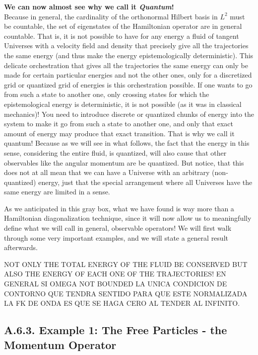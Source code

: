 \documentclass[11pt, a4paper]{article} %
\DeclareRobustCommand{\mybox}[2][gray!10]{%
\begin{tcolorbox}[   %
        left=0.2cm,
        right=0.2cm,
        top=0.15cm,
        bottom=0.15cm,
        colback=#1,
        colframe=#1,
        width=\dimexpr\textwidth\relax, 
        enlarge left by=0mm,
        boxsep=5pt,
        arc=0pt,outer arc=0pt,
        ]
        #2
\end{tcolorbox}
}
\begin{document}
\mybox{
{\bf We can now almost see why we call it {\em Quantum}!\\ }
Because in general, the cardinality of the orthonormal Hilbert basis in $L^2$ must be countable, the set of eigenstates of the Hamiltonian operator are in general countable. That is, it is not possible to have for any energy a fluid of tangent Universes with a velocity field and density that precisely give all the trajectories the same energy (and thus make the energy epistemologically deterministic). This delicate orchestration that gives all the trajectories the same energy can only be made for certain particular energies and not the other ones, only for a discretized grid or quantized grid of energies is this orchestration possible. If one wants to go from such a state to another one, only crossing states for which the epistemological energy is deterministic, it is not possible (as it was in classical mechanics)! You need to introduce discrete or quantized chunks of energy into the system to make it go from such a state to another one, and only that exact amount of energy may produce that exact transition. That is why we call it quantum! Because as we will see in what follows, the fact that the energy in this sense, considering the entire fluid, is quantized, will also cause that other observables like the angular momentum are be quantized. But notice, that this does not at all mean that we can have a Universe with an arbitrary (non-quantized) energy, just that the special arrangement where all Universes have the same energy are limited in a sense.
}



As we anticipated in this gray box, what we have found is way more than a Hamiltonian diagonalization technique, since it will now allow us to meaningfully define what we will call in general, observable operators! We will first walk through some very important examples, and we will state a general result afterwards.

NOT ONLY THE TOTAL ENERGY OF THE FLUID BE CONSERVED BUT ALSO THE ENERGY OF EACH ONE OF THE TRAJECTORIES!
EN GENERAL SI OMEGA NOT BOUNDED LA UNICA CONDICION DE CONTORNO QUE TENDRA SENTIDO PARA QUE ESTE NORMALIZADA LA FK DE ONDA ES QUE SE HAGA CERO AL TENDER AL INFINITO.



\subsection*{A.6.3. Example 1: The Free Particles - the Momentum Operator}
\end{document}
